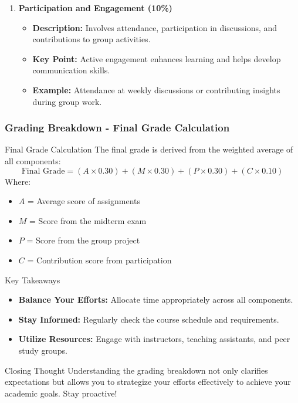 \documentclass[aspectratio=169]{beamer}
\begin{document}
\begin{frame}[fragile]
\begin{enumerate}
        \item \textbf{Participation and Engagement (10\%)}
            \begin{itemize}
                \item \textbf{Description:} Involves attendance, participation in discussions, and contributions to group activities.
                \item \textbf{Key Point:} Active engagement enhances learning and helps develop communication skills.
                \item \textbf{Example:} Attendance at weekly discussions or contributing insights during group work.
            \end{itemize}
    \end{enumerate}
\end{frame}

\begin{frame}[fragile]
    \frametitle{Grading Breakdown - Final Grade Calculation}
    \begin{block}{Final Grade Calculation}
        The final grade is derived from the weighted average of all components:
        \begin{equation}
            \text{Final Grade} = (A \times 0.30) + (M \times 0.30) + (P \times 0.30) + (C \times 0.10)
        \end{equation}
        Where:
        \begin{itemize}
            \item \( A \) = Average score of assignments
            \item \( M \) = Score from the midterm exam
            \item \( P \) = Score from the group project
            \item \( C \) = Contribution score from participation
        \end{itemize}
    \end{block}

    \begin{block}{Key Takeaways}
        \begin{itemize}
            \item \textbf{Balance Your Efforts:} Allocate time appropriately across all components.
            \item \textbf{Stay Informed:} Regularly check the course schedule and requirements.
            \item \textbf{Utilize Resources:} Engage with instructors, teaching assistants, and peer study groups.
        \end{itemize}
    \end{block}
    
    \begin{block}{Closing Thought}
        Understanding the grading breakdown not only clarifies expectations but allows you to strategize your efforts effectively to achieve your academic goals. Stay proactive!
    \end{block}
\end{frame}
\end{document}
